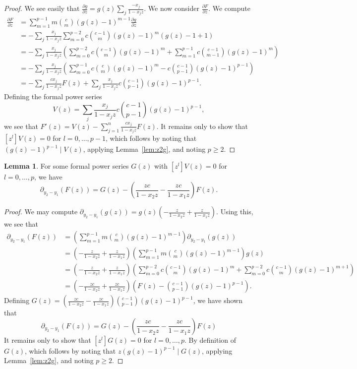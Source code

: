 \documentclass{amsart}
\numberwithin{equation}{section}
\theoremstyle{definition}
\newtheorem{lemma}[theorem]{Lemma}
\begin{document}
\begin{proof}
We see easily that $\frac{\partial g}{\partial z} = g(z) \sum_j \frac{-x_j}{1-x_jz}$. We now consider $\frac{\partial F}{\partial z}$. We compute
\begin{align*}
\frac{\partial F}{\partial z}
&=\sum_{m=1}^{p-1}m\binom{c}{m}(g(z)-1)^{m-1}\frac{\partial g}{\partial z}\\
&=-\sum_j \frac{x_j}{1-x_jz}\sum_{m=0}^{p-2}c\binom{c-1}{m}(g(z)-1)^{m}(g(z)-1+1)\\
&=-\sum_j \frac{x_j}{1-x_jz}\left(\sum_{m=0}^{p-2}c\binom{c-1}{m}(g(z)-1)^{m}+\sum_{m=1}^{p-1}c\binom{c-1}{m-1}(g(z)-1)^{m}\right)\\
&=-\sum_j \frac{x_j}{1-x_jz}\left(\sum_{m=0}^{p-1}c\binom{c}{m}(g(z)-1)^{m}-c\binom{c-1}{p-1}(g(z)-1)^{p-1}\right)\\
&=-\sum_j \frac{cx_j}{1-x_jz}F(z)+\sum_j \frac{x_j}{1-x_jz}c\binom{c-1}{p-1}(g(z)-1)^{p-1}.
\end{align*}
Defining the formal power series
\[
V(z)=\sum_j \frac{x_j}{1-x_jz}c\binom{c-1}{p-1}(g(z)-1)^{p-1},
\]
we see that $F'(z) = V(z) - \sum_{j=1}^{n} \frac{cx_j}{1-x_jz} F(z)$. It remains only to show that $[z^l]V(z)=0$ for $l=0,\dots,p-1$, which follows by noting that $(g(z)-1)^{p-1} \mid V(z)$, applying Lemma~\ref{lem:z2g}, and noting $p \ge 2$.
\end{proof}

\begin{lemma}\label{lem:dFdxi} 
For some formal power series $G(z)$ with $[z^l]V(z)=0$ for $l=0,\dots,p$, we have
\[
\partial_{y_2-y_1}(F(z))= G(z) - \left(\frac{zc}{1-x_2z}-\frac{zc}{1-x_1z}\right)F(z).
\]
\end{lemma}
\begin{proof}
We may compute $\partial_{y_2-y_1}(g(z))=g(z)\left(-\frac{z}{1-x_2z}+\frac{z}{1-x_1z}\right)$. Using this, we see that
\begin{align*}
\partial_{y_2-y_1}(F(z))&=\left(\sum_{m=1}^{p-1}m\binom{c}{m}(g(z)-1)^{m-1}\right)\partial_{y_2-y_1}(g(z))\\
&=\left(-\frac{z}{1-x_2z}+\frac{z}{1-x_1z}\right)\left(\sum_{m=1}^{p-1}m\binom{c}{m}(g(z)-1)^{m-1}\right)g(z)\\
&=\left(-\frac{z}{1-x_2z}+\frac{z}{1-x_1z}\right)\left(\sum_{m=0}^{p-2}c\binom{c-1}{m}(g(z)-1)^{m}+\sum_{m=0}^{p-2}c\binom{c-1}{m}(g(z)-1)^{m+1}\right)\\
&=\left(-\frac{zc}{1-x_2z}+\frac{zc}{1-x_1z}\right)\left(F(z)-\binom{c-1}{p-1}(g(z)-1)^{p-1}\right).
\end{align*}
Defining $G(z)=\left(\frac{zc}{1-x_2z}- \frac{zc}{1-x_1z}\right)\binom{c-1}{p-1}(g(z)-1)^{p-1}$, we have shown that
\[
\partial_{y_2-y_1}(F(z))= G(z) - \left(\frac{zc}{1-x_2z}-\frac{zc}{1-x_1z}\right)F(z)
\]
It remains only to show that $[z^l]G(z)=0$ for $l=0,\dots,p$. By definition of $G(z)$, which follows by noting that $z(g(z)-1)^{p-1} \mid G(z)$, applying Lemma~\ref{lem:z2g}, and noting $p \geq 2$.
\end{proof}
\end{document}
